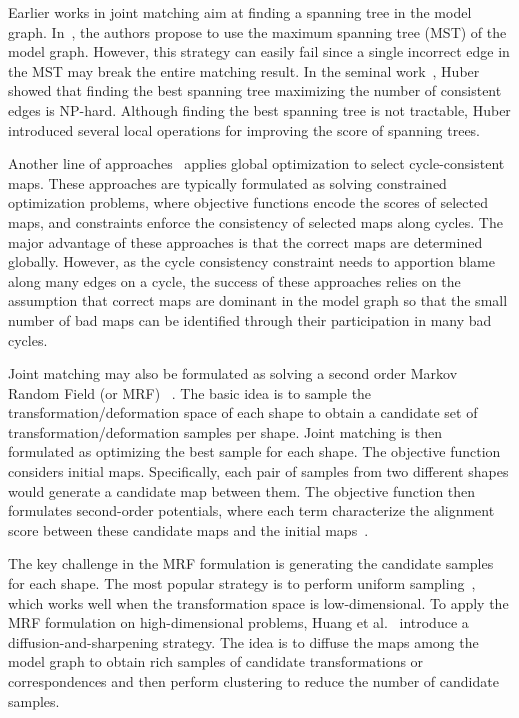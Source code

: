  Earlier works in joint matching aim at finding a spanning tree in the model graph. In~\cite{Goldberg:2004:GAA,Huang:2006:RFO}, the authors propose to use the maximum spanning tree (MST) of the model graph. However, this strategy can easily fail since a single incorrect edge in the MST may break the entire matching result. In the seminal work~\cite{Huber:2002:Thesis}, Huber showed that finding the best spanning tree maximizing the number of consistent edges is NP-hard. Although finding the best spanning tree is not tractable, Huber introduced several local operations for improving the score of spanning trees. 

 Another line of approaches~\cite{Zach:2010:DVR,Roberts:2011:SFM,Nguyen:2011:CSM} applies global optimization to select cycle-consistent maps. These approaches are typically formulated as solving constrained optimization problems, where objective functions encode the scores of selected maps, and constraints enforce the consistency of selected maps along cycles. The major advantage of these approaches is that the correct maps are determined globally. However, as the cycle consistency constraint needs to apportion blame along many edges on a cycle, the success of these approaches relies on the assumption that correct maps are dominant in the model graph so that the small number of bad maps can be identified through their participation in many bad cycles.

 Joint matching may also be formulated as solving a second order Markov Random Field (or MRF)~
\cite{Cho:2010:JPS,Cho:2010:TPT,Crandall:2011:DOL,Huang:2012:OAE}. The basic idea is to sample the transformation/deformation space of each shape to obtain a candidate set of transformation/deformation samples per shape. Joint matching is then formulated as optimizing the best sample for each shape. The objective function considers initial maps. Specifically, each pair of samples from two different shapes would generate a candidate map between them. The objective function then formulates second-order potentials, where each term characterize the alignment score between these candidate maps and the initial maps~\cite{Huang:2013:FSL,Huang:2012:OAE}.

The key challenge in the MRF formulation is generating the candidate samples for each shape. The most popular strategy is to perform uniform sampling~\cite{Crandall:2011:DOL,Huang:2013:FSL}, which works well when the transformation space is low-dimensional. To apply the MRF formulation on high-dimensional problems, Huang et al.~\cite{Huang:2012:OAE} introduce a diffusion-and-sharpening strategy. The idea is to diffuse the maps among the model graph to obtain rich samples of candidate transformations or correspondences and then perform clustering to reduce the number of candidate samples.



